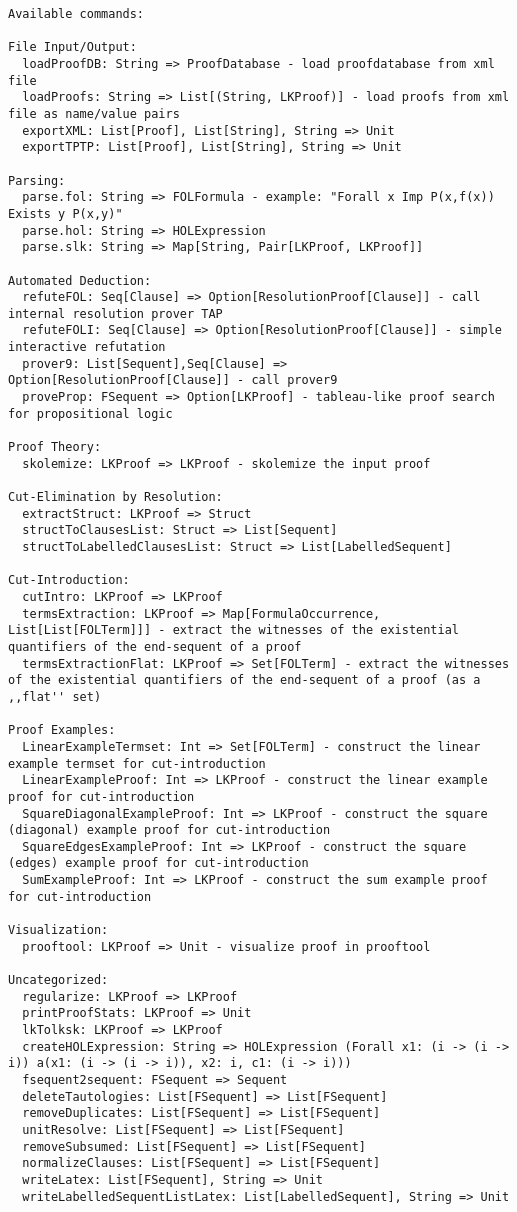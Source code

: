 \documentclass[a4paper, 11pt]{report}
\begin{document}
\begin{lstlisting}
Available commands:

File Input/Output:
  loadProofDB: String => ProofDatabase - load proofdatabase from xml file
  loadProofs: String => List[(String, LKProof)] - load proofs from xml file as name/value pairs
  exportXML: List[Proof], List[String], String => Unit
  exportTPTP: List[Proof], List[String], String => Unit

Parsing:
  parse.fol: String => FOLFormula - example: "Forall x Imp P(x,f(x)) Exists y P(x,y)"
  parse.hol: String => HOLExpression
  parse.slk: String => Map[String, Pair[LKProof, LKProof]]

Automated Deduction:
  refuteFOL: Seq[Clause] => Option[ResolutionProof[Clause]] - call internal resolution prover TAP
  refuteFOLI: Seq[Clause] => Option[ResolutionProof[Clause]] - simple interactive refutation
  prover9: List[Sequent],Seq[Clause] => Option[ResolutionProof[Clause]] - call prover9
  proveProp: FSequent => Option[LKProof] - tableau-like proof search for propositional logic

Proof Theory:
  skolemize: LKProof => LKProof - skolemize the input proof

Cut-Elimination by Resolution:
  extractStruct: LKProof => Struct
  structToClausesList: Struct => List[Sequent]
  structToLabelledClausesList: Struct => List[LabelledSequent]

Cut-Introduction:
  cutIntro: LKProof => LKProof
  termsExtraction: LKProof => Map[FormulaOccurrence, List[List[FOLTerm]]] - extract the witnesses of the existential quantifiers of the end-sequent of a proof
  termsExtractionFlat: LKProof => Set[FOLTerm] - extract the witnesses of the existential quantifiers of the end-sequent of a proof (as a ,,flat'' set)

Proof Examples:
  LinearExampleTermset: Int => Set[FOLTerm] - construct the linear example termset for cut-introduction
  LinearExampleProof: Int => LKProof - construct the linear example proof for cut-introduction
  SquareDiagonalExampleProof: Int => LKProof - construct the square (diagonal) example proof for cut-introduction
  SquareEdgesExampleProof: Int => LKProof - construct the square (edges) example proof for cut-introduction
  SumExampleProof: Int => LKProof - construct the sum example proof for cut-introduction

Visualization:
  prooftool: LKProof => Unit - visualize proof in prooftool

Uncategorized:
  regularize: LKProof => LKProof
  printProofStats: LKProof => Unit
  lkTolksk: LKProof => LKProof
  createHOLExpression: String => HOLExpression (Forall x1: (i -> (i -> i)) a(x1: (i -> (i -> i)), x2: i, c1: (i -> i)))
  fsequent2sequent: FSequent => Sequent
  deleteTautologies: List[FSequent] => List[FSequent]
  removeDuplicates: List[FSequent] => List[FSequent]
  unitResolve: List[FSequent] => List[FSequent]
  removeSubsumed: List[FSequent] => List[FSequent]
  normalizeClauses: List[FSequent] => List[FSequent]
  writeLatex: List[FSequent], String => Unit
  writeLabelledSequentListLatex: List[LabelledSequent], String => Unit
\end{lstlisting}
\end{document}
